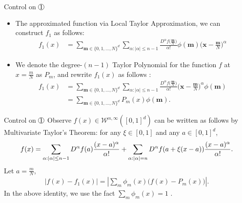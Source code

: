 \documentclass{if-beamer}
\newcommand*\circled[1]{\tikz[baseline=(char.base)]{
            \node[shape=circle,draw,inner sep=0.2pt] (char) {#1};}}
\begin{document}
\begin{frame}{Control on $\circled{1}$}
    \begin{itemize}
        \item The approximated function via Local Taylor Approximation, we can construct $f_{1}$ as follows:
        \begin{align*}
            f_{1}(x)
            &=\sum_{\textbf{m}\in\{0,1,\dots,N\}^{d}}\sum_{\alpha:|\alpha|\leq n-1}\frac{D^{\alpha}f\big(\frac{\textbf{m}}{N}\big)}{\alpha!}\phi(\textbf{m})\bigg(\textbf{x}-\frac{\textbf{m}}{N}\bigg)^{\alpha}
        \end{align*}
        \item We denote the degree-$(n-1)$ Taylor Polynomial for the function $f$ at $x=\frac{m}{N}$ as $P_m$, and rewrite $f_{1}(x)$ as follows :
        \begin{align*}
            f_{1}(x)&=\sum_{\textbf{m}\in\{0,1,\dots,N\}^{d}}\sum_{\alpha:|\alpha|\leq n-1}\frac{D^{\alpha}f\big(\frac{\textbf{m}}{N}\big)}{\alpha!}\bigg(\textbf{x}-\frac{\textbf{m}}{N}\bigg)^{\alpha}\phi(\textbf{m})\\
            &=\sum_{\textbf{m}\in\{0,1,\dots,N\}^{d}}P_{m}(x)\phi(\textbf{m}).
        \end{align*}
    \end{itemize}
\end{frame}

\begin{frame}{Control on $\circled{1}$}
    Observe $f(x)\in\mathcal{W}^{n,\infty}([0,1]^{d})$ can be written as follows by Multivariate Taylor's Theorem: for any $\xi \in [0,1]$ and any $a \in [0,1]^{d}$,
    \begin{equation*}
        \tiny
        f(x)=\sum_{\alpha:|\alpha|\leq n-1}D^{\alpha}f(a)\frac{(x-a)^{\alpha}}{\alpha!}+
        \sum_{\alpha:|\alpha|=n}D^{\alpha}f(a+\xi(x-a))\frac{(x-a)^{\alpha}}{\alpha!}.
     \end{equation*}
    Let $a=\frac{m}{N}$,
    \begin{align*}
        \left| f(x) - f_{1}(x) \right| = \left| \sum_{m}\phi_m(x) \big(f(x)-P_m(x)\big) \right|.
    \end{align*}
    In the above identity, we use the fact $\sum_{m}\phi_{m}(x)=1$ .
\end{frame}
\end{document}
